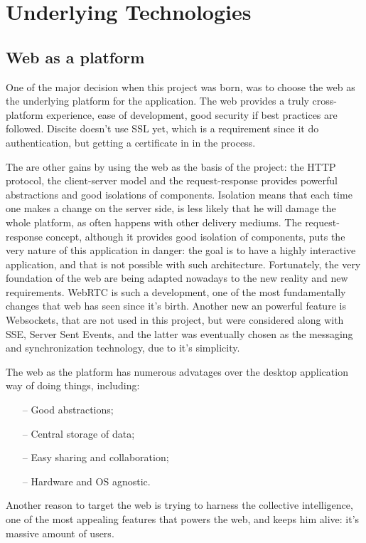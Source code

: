 
\section{Underlying Technologies}

\subsection{Web as a platform}
One of the major decision when this project was born, was to choose the web as
the underlying platform for the application. The web provides a truly cross-platform
experience, ease of development, good security if best practices are followed.
Discite doesn't use SSL yet, which is a requirement since it do authentication, but
getting a certificate in in the process.

The are other gains by using the web as the basis of the project:
the HTTP protocol, the client-server model and the request-response provides powerful
abstractions and good isolations of components. Isolation means that each time one
makes a change on the server side, is less likely that he will damage the whole platform,
as often happens with other delivery mediums.
The request-response concept, although it provides good isolation of components,
puts the very nature of this application in danger: the goal is to have a highly interactive
application, and that is not possible with such architecture. Fortunately, the very
foundation of the web are being adapted nowadays to the new reality and new requirements.
WebRTC is such a development, one of the most fundamentally changes that web has seen since
it's birth. Another new an powerful feature is Websockets, that are not used
in this project, but were considered along with SSE, Server Sent Events, and the latter was
eventually chosen as the messaging and synchronization technology, due to it's simplicity.

The web as the platform has numerous advatages over the desktop application way
of doing things, including:
\begin{enumerate}[topsep=5pt, partopsep=0pt,itemsep=3pt,parsep=1pt]
\item[--] Good abstractions;
\item[--] Central storage of data;
\item[--] Easy sharing and collaboration;
\item[--] Hardware and OS agnostic.
\end{enumerate}
Another reason to target the web is trying to harness the collective intelligence, one of the most
appealing features that powers the web, and keeps him alive: it's massive amount of users.
